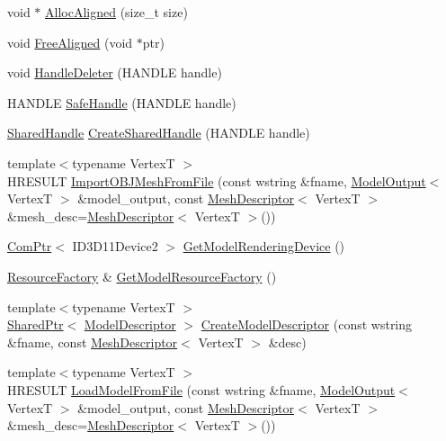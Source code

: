\begin{DoxyCompactItemize}
void $\ast$ \hyperlink{namespacemage_a6c97f75df305a5e0a945e82a26e75c38}{Alloc\+Aligned} (size\+\_\+t size)
\item 
void \hyperlink{namespacemage_a401c54df21447c491c527735647b5f80}{Free\+Aligned} (void $\ast$ptr)
\item 
void \hyperlink{namespacemage_ab8f0b2f46629338cab3de903274f1747}{Handle\+Deleter} (H\+A\+N\+D\+LE handle)
\item 
H\+A\+N\+D\+LE \hyperlink{namespacemage_a80f95ce7eb0d03d5576351663d626b4d}{Safe\+Handle} (H\+A\+N\+D\+LE handle)
\item 
\hyperlink{namespacemage_ab892828913d6129acf71e0cec60467e5}{Shared\+Handle} \hyperlink{namespacemage_a3119898d7caac71d8ee495c3ae3194b1}{Create\+Shared\+Handle} (H\+A\+N\+D\+LE handle)
\item 
{\footnotesize template$<$typename VertexT $>$ }\\H\+R\+E\+S\+U\+LT \hyperlink{namespacemage_acb4aa2ee8f4bb362e8cce1fe22e0adbf}{Import\+O\+B\+J\+Mesh\+From\+File} (const wstring \&fname, \hyperlink{structmage_1_1_model_output}{Model\+Output}$<$ VertexT $>$ \&model\+\_\+output, const \hyperlink{structmage_1_1_mesh_descriptor}{Mesh\+Descriptor}$<$ VertexT $>$ \&mesh\+\_\+desc=\hyperlink{structmage_1_1_mesh_descriptor}{Mesh\+Descriptor}$<$ VertexT $>$())
\item 
\hyperlink{namespacemage_ae74f374780900893caa5555d1031fd79}{Com\+Ptr}$<$ I\+D3\+D11\+Device2 $>$ \hyperlink{namespacemage_af12a2f088914281ec43dd91078c98a97}{Get\+Model\+Rendering\+Device} ()
\item 
\hyperlink{classmage_1_1_resource_factory}{Resource\+Factory} \& \hyperlink{namespacemage_af3f71027fd2cac8d444bae0335fb8fb2}{Get\+Model\+Resource\+Factory} ()
\item 
{\footnotesize template$<$typename VertexT $>$ }\\\hyperlink{namespacemage_a1e01ae66713838a7a67d30e44c67703e}{Shared\+Ptr}$<$ \hyperlink{classmage_1_1_model_descriptor}{Model\+Descriptor} $>$ \hyperlink{namespacemage_a8cc26f80d3cb6f3d457bb06942880d84}{Create\+Model\+Descriptor} (const wstring \&fname, const \hyperlink{structmage_1_1_mesh_descriptor}{Mesh\+Descriptor}$<$ VertexT $>$ \&desc)
\item 
{\footnotesize template$<$typename VertexT $>$ }\\H\+R\+E\+S\+U\+LT \hyperlink{namespacemage_a23fc9688b56289aa280a6cb7541dfbca}{Load\+Model\+From\+File} (const wstring \&fname, \hyperlink{structmage_1_1_model_output}{Model\+Output}$<$ VertexT $>$ \&model\+\_\+output, const \hyperlink{structmage_1_1_mesh_descriptor}{Mesh\+Descriptor}$<$ VertexT $>$ \&mesh\+\_\+desc=\hyperlink{structmage_1_1_mesh_descriptor}{Mesh\+Descriptor}$<$ VertexT $>$())

\end{DoxyCompactItemize}
